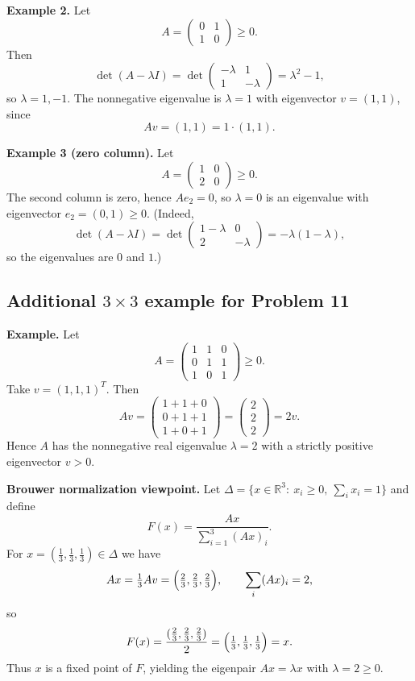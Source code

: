 \documentclass[12pt,a4paper]{article}
\theoremstyle{plain}
\theoremstyle{definition}      %
\begin{document}
\medskip
\noindent\textbf{Example 2.}
Let
\[
A=\begin{pmatrix}0&1\\1&0\end{pmatrix}\ge 0.
\]
Then
\[
\det(A-\lambda I)=\det\begin{pmatrix}-\lambda&1\\1&-\lambda\end{pmatrix}=\lambda^2-1,
\]
so $\lambda=1,-1$. The nonnegative eigenvalue is $\lambda=1$ with eigenvector $v=(1,1)$, since
\[
Av=(1,1)=1\cdot(1,1).
\]

\medskip
\noindent\textbf{Example 3 (zero column).}
Let
\[
A=\begin{pmatrix}1&0\\2&0\end{pmatrix}\ge 0.
\]
The second column is zero, hence $Ae_2=0$, so $\lambda=0$ is an eigenvalue with eigenvector $e_2=(0,1)\ge 0$.
(Indeed,
\[
\det(A-\lambda I)=\det\begin{pmatrix}1-\lambda&0\\2&-\lambda\end{pmatrix}=-\lambda(1-\lambda),
\]
so the eigenvalues are $0$ and $1$.)

\subsection*{Additional $3\times 3$ example for Problem 11}

\noindent\textbf{Example.}
Let
\[
A=\begin{pmatrix}
	1&1&0\\
	0&1&1\\
	1&0&1
\end{pmatrix}\ge 0.
\]
Take $v=(1,1,1)^T$. Then
\[
Av=
\begin{pmatrix}
	1+1+0\\
	0+1+1\\
	1+0+1
\end{pmatrix}
=
\begin{pmatrix}
	2\\2\\2
\end{pmatrix}
=2v.
\]
Hence $A$ has the nonnegative real eigenvalue $\lambda=2$ with a strictly positive eigenvector $v>0$.

\medskip
\noindent\textbf{Brouwer normalization viewpoint.}
Let $\Delta=\{x\in\mathbb{R}^3:\ x_i\ge 0,\ \sum_i x_i=1\}$ and define
\[
F(x)=\frac{Ax}{\sum_{i=1}^3 (Ax)_i}.
\]
For $x=(\tfrac13,\tfrac13,\tfrac13)\in\Delta$ we have
\[
Ax=\tfrac13 Av=\Bigl(\tfrac23,\tfrac23,\tfrac23\Bigr),\qquad \sum_i (Ax)_i = 2,
\]
so
\[
F(x)=\frac{(\tfrac23,\tfrac23,\tfrac23)}{2}=\Bigl(\tfrac13,\tfrac13,\tfrac13\Bigr)=x.
\]
Thus $x$ is a fixed point of $F$, yielding the eigenpair $Ax=\lambda x$ with $\lambda=2\ge 0$.
\end{document}
